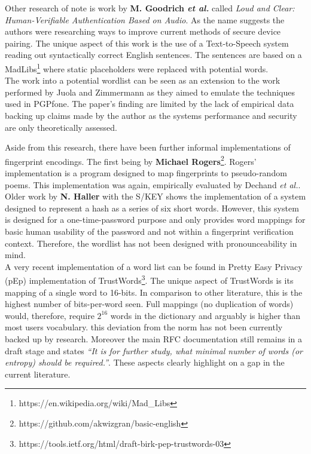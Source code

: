 Other research of note is work by \textbf{M. Goodrich \textit{et al.}}\cite{goodrich2006loud} called \textit{Loud and Clear: Human-Verifiable Authentication Based on Audio}. As the name suggests the authors were researching ways to improve current methods of secure device pairing. The unique aspect of this work is the use of a Text-to-Speech system reading out syntactically correct English sentences. The sentences are based on a MadLibs\footnote{https://en.wikipedia.org/wiki/Mad\_Libs} where static placeholders were replaced with potential words.\\
The work into a potential wordlist can be seen as an extension to the work performed by Juola and Zimmermann\cite{juola1996whole} as they aimed to emulate the techniques used in PGPfone. The paper's finding are limited by the lack of empirical data backing up claims made by the author as the systems performance and security are only theoretically assessed.

Aside from this research, there have been further informal implementations of fingerprint encodings. The first being by \textbf{Michael Rogers}\footnote{https://github.com/akwizgran/basic-english}. Rogers' implementation is a program designed to map fingerprints to pseudo-random poems. This implementation was again, empirically evaluated by Dechand \textit{et al.}\cite{dechand2016empirical}. Older work by \textbf{N. Haller} with the S/KEY\cite{haller1995s} shows the implementation of a system designed to represent a hash as a series of six short words. However, this system is designed for a one-time-password purpose and only provides word mappings for basic human usability of the password and not within a fingerprint verification context. Therefore, the wordlist has not been designed with pronounceability in mind.
\\
A very recent implementation of a word list can be found in Pretty Easy Privacy (pEp) implementation of TrustWords\footnote{https://tools.ietf.org/html/draft-birk-pep-trustwords-03}. The unique aspect of TrustWords is its mapping of a single word to 16-bits. In comparison to other literature, this is the highest number of bits-per-word seen. Full mappings (no duplication of words) would, therefore, require $2^{16}$ words in the dictionary and arguably is higher than most users vocabulary. this deviation from the norm has not been currently backed up by research. Moreover the main RFC documentation still remains in a draft stage and states \textit{``It is for further study, what minimal number of words (or entropy) should be required.''}. These aspects clearly highlight on a gap in the current literature.

